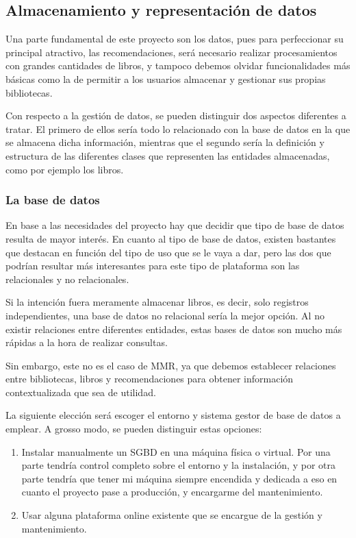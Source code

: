\subsection{Almacenamiento y representación de datos}

Una parte fundamental de este proyecto son los datos, pues para perfeccionar su principal atractivo, las recomendaciones, será necesario realizar procesamientos con grandes cantidades de libros, y tampoco debemos olvidar funcionalidades más básicas como la de permitir a los usuarios almacenar y gestionar sus propias bibliotecas.

Con respecto a la gestión de datos, se pueden distinguir dos aspectos diferentes a tratar. El primero de ellos sería todo lo relacionado con la base de datos en la que se almacena dicha información, mientras que el segundo sería la definición y estructura de las diferentes clases que representen las entidades almacenadas, como por ejemplo los libros.

\subsubsection{La base de datos}

En base a las necesidades del proyecto hay que decidir que tipo de base de datos resulta de mayor interés. En cuanto al tipo de base de datos, existen bastantes que destacan en función del tipo de uso que se le vaya a dar, pero las dos que podrían resultar más interesantes para este tipo de plataforma son las relacionales y no relacionales.

Si la intención fuera meramente almacenar libros, es decir, solo registros independientes, una base de datos no relacional sería la mejor opción. Al no existir relaciones entre diferentes entidades, estas bases de datos son mucho más rápidas a la hora de realizar consultas.

Sin embargo, este no es el caso de MMR, ya que debemos establecer relaciones entre bibliotecas, libros y recomendaciones para obtener información contextualizada que sea de utilidad.

La siguiente elección será escoger el entorno y sistema gestor de base de datos a emplear. A grosso modo, se pueden distinguir estas opciones:

\begin{enumerate}
    \item Instalar manualmente un SGBD en una máquina física o virtual. Por una parte tendría control completo sobre el entorno y la instalación, y por otra parte tendría que tener mi máquina siempre encendida y dedicada a eso en cuanto el proyecto pase a producción, y encargarme del mantenimiento.
    \item Usar alguna plataforma online existente que se encargue de la gestión y mantenimiento.
\end{enumerate}

